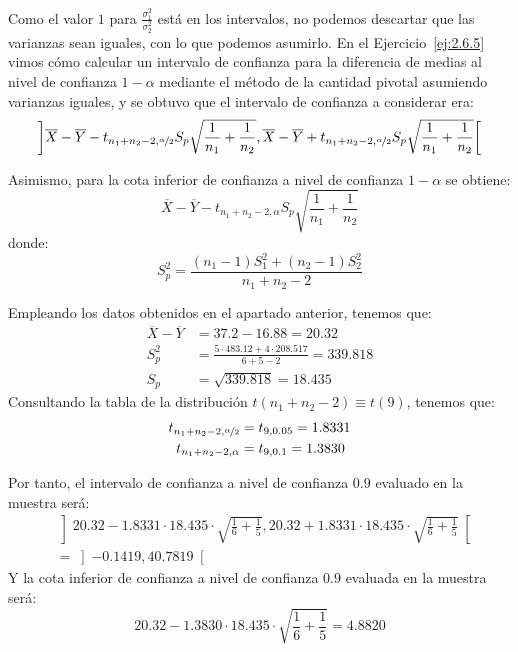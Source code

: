\begin{ejercicio}
\begin{enumerate}[label=\alph*)]
            Como el valor $1$ para $\frac{\sigma_1^2}{\sigma_2^2}$ está en los intervalos, no podemos descartar que las varianzas sean iguales, con lo que podemos asumirlo. En el Ejercicio~\ref{ej:2.6.5} vimos cómo calcular un intervalo de confianza para la diferencia de medias al nivel de confianza $1-\alpha$ mediante el método de la cantidad pivotal asumiendo varianzas iguales, y se obtuvo que el intervalo de confianza a considerar era:
            \begin{equation*}
                \left]\overline{X}-\overline{Y}-t_{n_1+n_2-2,\nicefrac{\alpha}{2}}S_p\sqrt{\frac{1}{n_1}+\frac{1}{n_2}},\overline{X}-\overline{Y}+t_{n_1+n_2-2,\nicefrac{\alpha}{2}}S_p\sqrt{\frac{1}{n_1}+\frac{1}{n_2}}\right[
            \end{equation*}

            Asimismo, para la cota inferior de confianza a nivel de confianza $1-\alpha$ se obtiene:
            \begin{equation*}
                \overline{X}-\overline{Y}-t_{n_1+n_2-2,\alpha}S_p\sqrt{\frac{1}{n_1}+\frac{1}{n_2}}
            \end{equation*}
            donde:
            \begin{equation*}
                S_p^2 = \frac{(n_1-1)S_1^2 + (n_2-1)S_2^2}{n_1+n_2-2}
            \end{equation*}

            Empleando los datos obtenidos en el apartado anterior, tenemos que:
            \begin{align*}
                \overline{X}-\overline{Y} &= 37.2-16.88 = 20.32 \\
                S_p^2 &= \frac{5\cdot 483.12 + 4\cdot 208.517}{6+5-2} = 339.818 \\
                S_p &= \sqrt{339.818} = 18.435
            \end{align*}
            Consultando la tabla de la distribución $t(n_1+n_2-2)\equiv t(9)$, tenemos que:
            \begin{align*}
                t_{n_1+n_2-2,\nicefrac{\alpha}{2}} &= t_{9,0.05} = 1.8331 \\
                t_{n_1+n_2-2,\alpha} &= t_{9,0.1} = 1.3830
            \end{align*}

            Por tanto, el intervalo de confianza a nivel de confianza $0.9$ evaluado en la muestra será:
            \begin{align*}
                &\left]20.32-1.8331\cdot 18.435\cdot \sqrt{\frac{1}{6}+\frac{1}{5}}, 20.32+1.8331\cdot 18.435\cdot \sqrt{\frac{1}{6}+\frac{1}{5}}\right[ \\
                &= \left]-0.1419, 40.7819\right[
            \end{align*}
            Y la cota inferior de confianza a nivel de confianza $0.9$ evaluada en la muestra será:
            \begin{equation*}
                20.32-1.3830\cdot 18.435\cdot \sqrt{\frac{1}{6}+\frac{1}{5}} = 4.8820
            \end{equation*}
            

\end{enumerate}
\end{ejercicio}
